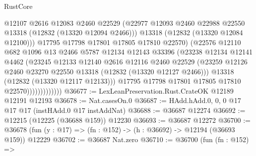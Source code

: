 \begin{lexlean}{RustCore}
\begin{coremodule}
                              @12107
                              @2616
                              @12083
                              @2460
                              @22529
                              (@22977
                                @12093
                                @2460
                                @22988
                                @22550
                                @13318
                                (@12832 (@13320 @12094 @2466)))
                              @13318
                              (@12832 (@13320 @12084 @12100)))
                            @17795
                            @17798
                            @17801
                            @17805
                            @17810
                            @22570)
                          (@22576
                            @12110
                            @682
                            @1096
                            @13
                            @2466
                            @5787
                            @12134
                            @12143
                            @33396
                            (@23238
                              @12134
                              @12141
                              @4462
                              (@23245
                                @12133
                                @12140
                                @2616
                                @12116
                                @2460
                                @22529
                                (@23259
                                  @12126
                                  @2460
                                  @23270
                                  @22550
                                  @13318
                                  (@12832 (@13320 @12127 @2466)))
                                @13318
                                (@12832 (@13320 @12117 @12133)))
                              @17795
                              @17798
                              @17801
                              @17805
                              @17810
                              @22570)))))))))))))
@36677 := LexLeanPreservation.Rust.CrateOK @12189 @12191 @12193
@36678 := Nat.casesOn.{0}
@36687 := HAdd.hAdd.{0, 0, 0} @17 @17 @17 (instHAdd.{0} @17 instAddNat)
@36688 := @36687 @12274
@36692 := @12215 (@12225 (@36688 @159)) @12230
@36693 := @36687 @12272
@36700 := @36678 (fun (y : @17) => (fn : @152) -> (h : @36692) -> @12194 (@36693 @159)) @12229
@36702 := @36687 Nat.zero
@36710 := @36700
    (fun (fn : @152) =>

\end{coremodule}
\end{lexlean}
